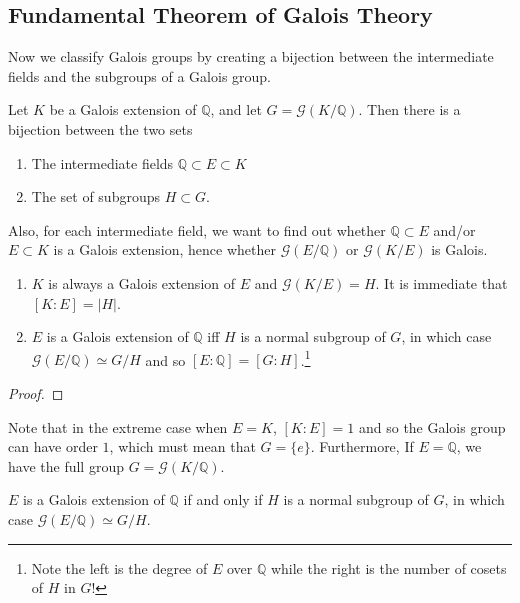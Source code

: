   \begin{example}
    
  \end{example}

\subsection{Fundamental Theorem of Galois Theory}

  Now we classify Galois groups by creating a bijection between the intermediate fields and the subgroups of a Galois group. 

  \begin{theorem}
    Let $K$ be a Galois extension of $\mathbb{Q}$, and let $G = \mathcal{G}(K/\mathbb{Q})$. Then there is a bijection between the two sets
    \begin{enumerate}
      \item The intermediate fields $\mathbb{Q} \subset E \subset K$
      \item The set of subgroups $H \subset G$. 
    \end{enumerate} 
    Also, for each intermediate field, we want to find out whether $\mathbb{Q} \subset E$ and/or $E \subset K$ is a Galois extension, hence whether $\mathcal{G}(E/\mathbb{Q})$ or $\mathcal{G}(K/E)$ is Galois. 
    \begin{enumerate}
      \item $K$ is always a Galois extension of $E$ and $\mathcal{G}(K/E) = H$. It is immediate that $[K:E] = |H|$. 
      \item $E$ is a Galois extension of $\mathbb{Q}$ iff $H$ is a normal subgroup of $G$, in which case $\mathcal{G}(E/\mathbb{Q}) \simeq G/H$ and so $[E:\mathbb{Q}] = [G:H]$.\footnote{Note the left is the degree of $E$ over $\mathbb{Q}$ while the right is the number of cosets of $H$ in $G$!} 
    \end{enumerate}
  \end{theorem}
  \begin{proof}
    
  \end{proof}

  Note that in the extreme case when $E = K$, $[K:E] = 1$ and so the Galois group can have order $1$, which must mean that $G = \{e\}$. Furthermore, If $E = \mathbb{Q}$, we have the full group $G = \mathcal{G}(K/\mathbb{Q})$. 

  \begin{corollary}
    $E$ is a Galois extension of $\mathbb{Q}$ if and only if $H$ is a normal subgroup of $G$, in which case $\mathcal{G}(E/\mathbb{Q}) \simeq G/H$. 
  \end{corollary}


